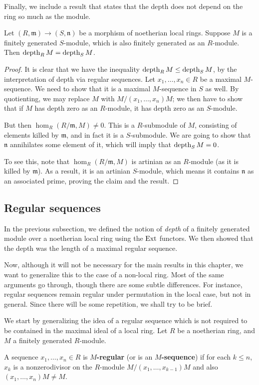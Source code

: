 Finally, we include a result that states that the depth does not depend
on the ring so much as the module.
\begin{proposition}
Let $(R, \mathfrak{m}) \to (S, \mathfrak{n})$ be a morphism of
noetherian local rings. Suppose $M$ is a finitely generated $S$-module,
which is also finitely generated as an $R$-module. Then 
$\operatorname{depth}_R M = \operatorname{depth}_S M$.
\end{proposition} 
\begin{proof} 
It is clear that we have the inequality $\operatorname{depth}_R M \leq \operatorname{depth}_S M$, by the
interpretation of depth via regular sequences. Let $x_1, \dots, x_n \in R$
be a maximal $M$-sequence. We need to show that it is a maximal $M$-sequence
in $S$ as well. By quotienting, we may replace $M$ with $M/(x_1,\dots, x_n)M$;
we then have to show that if $M$ has depth zero as an $R$-module, it has
depth zero as an $S$-module.

But then $\hom_R(R/\mathfrak{m}, M) \neq 0$. This is a $R$-submodule of
$M$, consisting of elements killed by $\mathfrak{m}$,
and in fact it is a $S$-submodule. We are going to show that $\mathfrak{n}$
annihilates some element of it, which will imply that $\operatorname{depth}_S M = 0$.

To see this, note that $\hom_R(R/\mathfrak{m}, M)$ is artinian as an
$R$-module (as it is killed by $\mathfrak{m}$). As a result, it is an
artinian $S$-module, which means it contains $\mathfrak{n}$ as an
associated prime, proving the claim and the result.
\end{proof} 
\subsection{Regular sequences}

In the previous subsection, we defined the notion of \emph{depth} of a
finitely generated module over a noetherian local ring using the $\operatorname{Ext}$
functors. We then showed that the depth was the length of a maximal regular
sequence. 

Now, although it will not be necessary for the main results in this chapter, we want to generalize this to the case of a non-local ring. Most of the
same arguments go through, though there are some subtle differences. For
instance, regular sequences remain regular under permutation in the local
case, but not in general. Since there will be some repetition, we shall try to
be brief.

We start by generalizing the idea of a regular sequence which is not required
to be contained in the maximal ideal of a local ring.
Let $R$ be a noetherian ring, and $M$ a finitely generated $R$-module. 
\begin{definition} 
A sequence $x_1, \dots, x_n \in R$ is \textbf{$M$-regular} (or is an
\textbf{$M$-sequence}) if for each $k \leq n$, $x_k$ is a nonzerodivisor on the
$R$-module $M/(x_1, \dots, x_{k-1}) M$ and also $(x_1, \dots, x_n) M \neq M$. 	\end{definition} 

